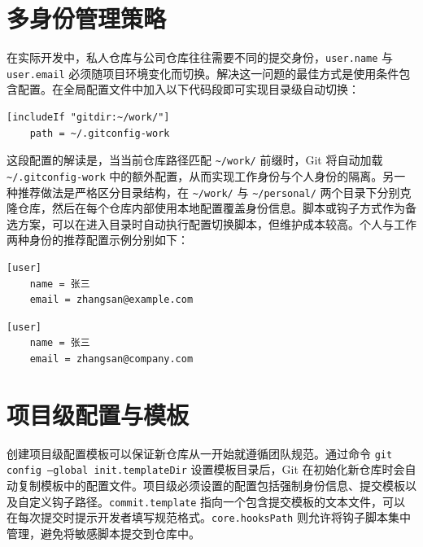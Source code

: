 \chapter{多身份管理策略}
在实际开发中，私人仓库与公司仓库往往需要不同的提交身份，\texttt{user.name} 与 \texttt{user.email} 必须随项目环境变化而切换。解决这一问题的最佳方式是使用条件包含配置。在全局配置文件中加入以下代码段即可实现目录级自动切换：\par
\begin{lstlisting}
[includeIf "gitdir:~/work/"]
    path = ~/.gitconfig-work
\end{lstlisting}
这段配置的解读是，当当前仓库路径匹配 \texttt{\~{}/work/} 前缀时，Git 将自动加载 \texttt{\~{}/.gitconfig-work} 中的额外配置，从而实现工作身份与个人身份的隔离。另一种推荐做法是严格区分目录结构，在 \texttt{\~{}/work/} 与 \texttt{\~{}/personal/} 两个目录下分别克隆仓库，然后在每个仓库内部使用本地配置覆盖身份信息。脚本或钩子方式作为备选方案，可以在进入目录时自动执行配置切换脚本，但维护成本较高。个人与工作两种身份的推荐配置示例分别如下：\par
\begin{lstlisting}
[user]
    name = 张三
    email = zhangsan@example.com
\end{lstlisting}
\begin{lstlisting}
[user]
    name = 张三
    email = zhangsan@company.com
\end{lstlisting}
\chapter{项目级配置与模板}
创建项目级配置模板可以保证新仓库从一开始就遵循团队规范。通过命令 \texttt{git config --global init.templateDir} 设置模板目录后，Git 在初始化新仓库时会自动复制模板中的配置文件。项目级必须设置的配置包括强制身份信息、提交模板以及自定义钩子路径。\texttt{commit.template} 指向一个包含提交模板的文本文件，可以在每次提交时提示开发者填写规范格式。\texttt{core.hooksPath} 则允许将钩子脚本集中管理，避免将敏感脚本提交到仓库中。\par
